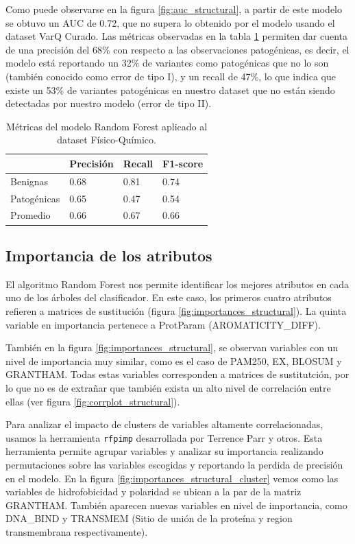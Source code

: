 Como puede observarse en la figura \ref{fig:auc_structural}, a partir de este modelo se obtuvo un AUC de 0.72, que no supera lo obtenido por el modelo usando el dataset VarQ Curado. Las métricas observadas en la tabla \ref{structural_table} permiten dar cuenta de una precisión del 68\% con respecto a las observaciones patogénicas, es decir, el modelo está reportando un 32\% de variantes como patogénicas que no lo son (también conocido como error de tipo I), y un recall de 47\%, lo que indica que existe un 53\% de variantes patogénicas en nuestro dataset que no están siendo detectadas por nuestro modelo (error de tipo II). 

\begin{table}[H]
\centering
\begin{tabular}{|l|l|l|l|}
\hline
              & Precisión & Recall & F1-score \\ \hline
Benignas      & 0.68      & 0.81   & 0.74     \\ \hline
Patogénicas   & 0.65      & 0.47   & 0.54     \\ \hline
Promedio      & 0.66      & 0.67   & 0.66     \\ \hline
\end{tabular}
\caption{Métricas del modelo Random Forest aplicado al dataset Físico-Químico.}
\label{structural_table}
\end{table}


\subsection{Importancia de los atributos}

El algoritmo Random Forest nos permite identificar los mejores atributos en cada uno de los árboles del clasificador. En este caso, los primeros cuatro atributos refieren a matrices de sustitución (figura \ref{fig:importances_structural}). La quinta variable en importancia pertenece a ProtParam (AROMATICITY\_DIFF). 

También en la figura \ref{fig:importances_structural}, se observan variables con un nivel de importancia muy similar, como es el caso de PAM250, EX, BLOSUM y GRANTHAM. Todas estas variables corresponden a matrices de sustitutción, por lo que no es de extrañar que también exista un alto nivel de correlación entre ellas (ver figura \ref{fig:corrplot_structural}). 

Para analizar el impacto de clusters de variables altamente correlacionadas, usamos la herramienta \texttt{rfpimp} desarrollada por Terrence Parr y otros. Esta herramienta permite agrupar variables y analizar su importancia realizando permutaciones sobre las variables escogidas y reportando la perdida de precisión en el modelo. En la figura \ref{fig:importances_structural_cluster} vemos como las variables de hidrofobicidad y polaridad se ubican a la par de la matriz GRANTHAM. También aparecen nuevas variables en nivel de importancia, como DNA\_BIND y TRANSMEM (Sitio de unión de la proteína y region transmembrana respectivamente).


